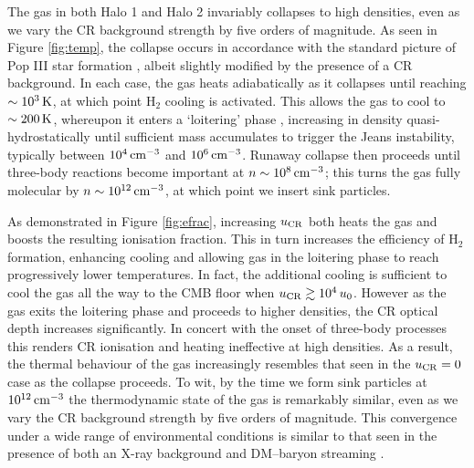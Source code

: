 \documentclass[usenatbib]{mn2e}
\newcommand{\kelvin}{\,{\rm K}}
\newcommand{\cc}{\,{\rm cm}^{-3}}
\newcommand{\htwo}{\mathrm{H}_2}
\newcommand{\ucr}{{u}_{\rm \small CR}}
\begin{document}
The gas in both Halo 1 and Halo 2 invariably collapses to high densities, even as we vary the CR background strength by five orders of magnitude. 
As seen in Figure \ref{fig:temp}, the collapse occurs in accordance with the standard picture of Pop III star formation \citep[e.g.,][]{Greifetal2012,StacyBromm2013,Hiranoetal2014,Hosokawaetal2015}, albeit slightly modified by the presence of a CR background.  
In each case, the gas heats adiabatically as it collapses until reaching $\sim10^3\kelvin$, at which point $\htwo$ cooling is activated.  
This allows the gas to cool to $\sim200\kelvin$, whereupon it enters a `loitering' phase \citep{BrommCoppiLarson2002}, increasing in density quasi-hydrostatically until sufficient mass accumulates to trigger the Jeans instability, typically between $10^4\cc$ and $10^6\cc$. 
Runaway collapse then proceeds until three-body reactions become important at $n\sim10^8\cc$; this turns the gas fully molecular by $n\sim10^{12}\cc$, at which point we insert sink particles.

As demonstrated in Figure \ref{fig:efrac}, increasing $\ucr$ both heats the gas and boosts the resulting ionisation fraction.
This in turn increases the efficiency of $\htwo$ formation, enhancing cooling and allowing gas in the loitering phase to reach progressively lower temperatures. 
In fact, the additional cooling is sufficient to cool the gas all the way to the CMB floor when $\ucr \gtrsim 10^4\,u_0$. 
However as the gas exits the loitering phase and proceeds to higher densities, the CR optical depth increases significantly. 
In concert with the onset of three-body processes this renders CR ionisation and heating ineffective at high densities. 
As a result, the thermal behaviour of the gas increasingly resembles that seen in the $\ucr=0$ case as the collapse proceeds. 
To wit, by the time we form sink particles at  $10^{12}\cc$ the thermodynamic state of the gas is remarkably similar, even as we vary the CR background strength by five orders of magnitude.
This convergence under a wide range of environmental conditions is similar to that seen in the presence of both an X-ray background \citep{Hummeletal2015} and DM--baryon streaming \citep{StacyBrommLoeb2011a,Greifetal2011b}.
\end{document}
